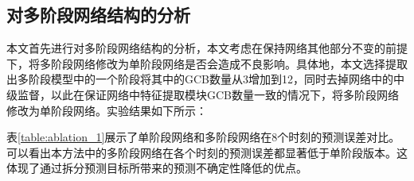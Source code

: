 \subsection{对多阶段网络结构的分析}
本文首先进行对多阶段网络结构的分析，本文考虑在保持网络其他部分不变的前提下，将多阶段网络修改为单阶段网络是否会造成不良影响。具体地，本文选择提取出多阶段模型中的一个阶段将其中的GCB数量从3增加到12，同时去掉网络中的中级监督，以此在保证网络中特征提取模块GCB数量一致的情况下，将多阶段网络修改为单阶段网络。实验结果如下所示：

\begin{table}[h]
    \begin{center}
    \end{center}
    \caption{单阶段网络与多阶段网络对比}
    \label{table:ablation_1}
    \end{table}

表\ref{table:ablation_1}展示了单阶段网络和多阶段网络在8个时刻的预测误差对比。可以看出本方法中的多阶段网络在各个时刻的预测误差都显著低于单阶段版本。这体现了通过拆分预测目标所带来的预测不确定性降低的优点。

